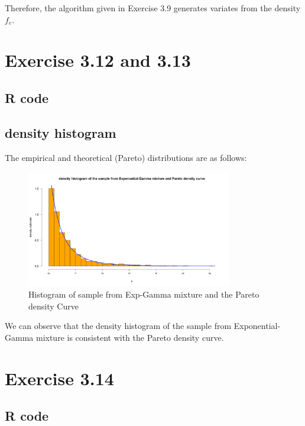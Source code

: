 \documentclass{article}
\begin{document}
     Therefore, the algorithm given in Exercise 3.9 generates variates from the density $f_e$.
     
\section{Exercise 3.12 and 3.13}
	\subsection{R code}
	
	\subsection{density histogram}
	 The empirical and theoretical (Pareto) distributions are as follows:
	 \begin{figure}[H]
	 	\centering  %
	 	\includegraphics[width=0.8\textwidth]{Exp-Gamma mixture}
	 	\caption{Histogram of sample from Exp-Gamma mixture and the Pareto density Curve}
	 \end{figure}
	 
	 We can observe that the density histogram of the sample from Exponential-Gamma mixture is consistent with the Pareto density curve.
	 
\section{Exercise 3.14}
    \subsection{R code}
        
\end{document}

